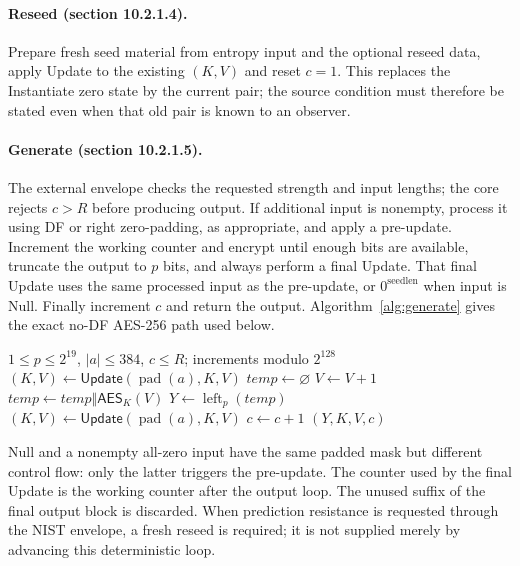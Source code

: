 \documentclass[journal=tosc,preprint,floatrow,nohyperxmp]{iacrtrans}
\numberwithin{lemma}{section}
\numberwithin{proposition}{section}
\newcommand{\Enc}{\mathsf{AES}}
\newcommand{\Upd}{\ensuremath{\mathsf{Update}}}
\newcommand{\pad}{\operatorname{pad}}
\numberwithin{equation}{section}
\theoremstyle{definition}
\numberwithin{definition}{section}
\theoremstyle{plain}
\begin{document}
\paragraph{Reseed (section 10.2.1.4).}
Prepare fresh seed material from entropy input and the optional reseed data, apply Update to the existing $(K,V)$ and reset $c=1$. This replaces the Instantiate zero state by the current pair; the source condition must therefore be stated even when that old pair is known to an observer.

\paragraph{Generate (section 10.2.1.5).}
The external envelope checks the requested strength and input lengths; the core rejects $c>R$ before producing output. If additional input is nonempty, process it using DF or right zero-padding, as appropriate, and apply a pre-update. Increment the working counter and encrypt until enough bits are available, truncate the output to $p$ bits, and always perform a final Update. That final Update uses the same processed input as the pre-update, or $0^{\mathrm{seedlen}}$ when input is Null. Finally increment $c$ and return the output. Algorithm~\ref{alg:generate} gives the exact no-DF AES-256 path used below.

\begin{algorithm}[htbp]
\caption{Successful Generate in the analyzed AES-256 no-DF profile}\label{alg:generate}
\begin{algorithmic}[1]
\Require $1\le p\le2^{19}$, $|a|\le384$, $c\le R$; increments modulo $2^{128}$
  \State $(K,V)\gets\Upd(\pad(a),K,V)$
\EndIf
\State $\mathit{temp}\gets\varnothing$
  \State $V\gets V+1$
  \State $\mathit{temp}\gets\mathit{temp}\Vert\Enc_K(V)$
\EndFor
\State $Y\gets\operatorname{left}_p(\mathit{temp})$
\State $(K,V)\gets\Upd(\pad(a),K,V)$ \Comment{$\pad(\varnothing)=0^{384}$}
\State $c\gets c+1$
\State \Return $(Y,K,V,c)$
\end{algorithmic}
\end{algorithm}

Null and a nonempty all-zero input have the same padded mask but different control flow: only the latter triggers the pre-update. The counter used by the final Update is the working counter after the output loop. The unused suffix of the final output block is discarded. When prediction resistance is requested through the NIST envelope, a fresh reseed is required; it is not supplied merely by advancing this deterministic loop.
\end{document}

